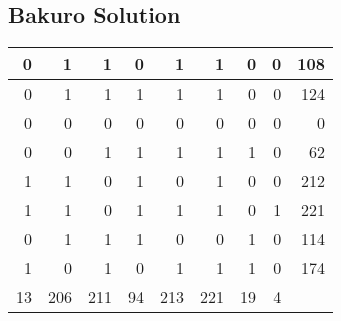 \documentclass[]{article}
\begin{document}
 \subsection{Bakuro Solution} 
\begin{tabular}{rrrrrrrrr}
\hline
  0 &   1 &   1 &  0 &   1 &   1 &  0 & 0 & 108 \\ \hline
  0 &   1 &   1 &  1 &   1 &   1 &  0 & 0 & 124 \\ \hline
  0 &   0 &   0 &  0 &   0 &   0 &  0 & 0 &   0 \\ \hline
  0 &   0 &   1 &  1 &   1 &   1 &  1 & 0 &  62 \\ \hline
  1 &   1 &   0 &  1 &   0 &   1 &  0 & 0 & 212 \\ \hline
  1 &   1 &   0 &  1 &   1 &   1 &  0 & 1 & 221 \\ \hline
  0 &   1 &   1 &  1 &   0 &   0 &  1 & 0 & 114 \\ \hline
  1 &   0 &   1 &  0 &   1 &   1 &  1 & 0 & 174 \\ \hline
 13 & 206 & 211 & 94 & 213 & 221 & 19 & 4 &     \\ \hline
\hline
\end{tabular}\newpage
 
\end{document}
